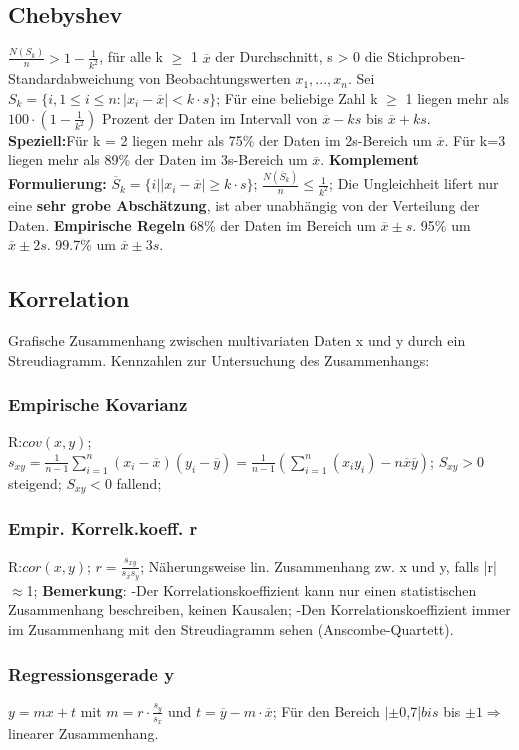       \subsection{Chebyshev}
      $\frac{N(S_{k})}{n} > 1-\frac{1}{k^2}$, für alle k $\geq$ 1
      $\overline{x}$ der Durchschnitt, s > 0 die Stichproben-Standardabweichung von Beobachtungswerten $x_{1}, ..., x_{n}$. Sei $S_{k} = \{i, 1 \leq i \leq n: |x_{i} - \overline{x}| < k \cdot s\}$; Für eine beliebige Zahl k $\geq$ 1 liegen mehr als $100 \cdot (1-\frac{1}{k^2})$ Prozent der Daten im Intervall von $\overline{x} - ks$ bis $ \overline{x} + ks$. \textbf{Speziell:}Für k = 2 liegen mehr als 75\% der Daten im 2s-Bereich um $\overline{x}$. Für k=3 liegen mehr als 89\% der Daten im 3s-Bereich um $\overline{x}$. \textbf{Komplement Formulierung:} $\overline{S}_{k} = \{i | |x_{i}-\overline{x}| \geq k \cdot s\}$; 
      $\frac{N(\overline{S}_{k})}{n} \leq \frac{1}{k^2}$; Die Ungleichheit lifert nur eine \textbf{sehr grobe Abschätzung}, ist aber unabhängig von der Verteilung der Daten. \textbf{Empirische Regeln} 68\% der Daten im Bereich um $\overline{x} \pm s$. 95\% um $\overline{x} \pm 2s$. 99.7\% um $\overline{x} \pm3s$.
      \subsection{Korrelation}
      Grafische Zusammenhang zwischen multivariaten Daten x und y durch ein Streudiagramm. Kennzahlen zur Untersuchung des Zusammenhangs:
      \subsubsection{Empirische Kovarianz}
      R:$cov(x,y)$;
      $s_{xy} = \frac{1}{n-1}\sum_{i=1}^{n}(x_{i}-\overline{x})(y_{i}-\overline{y})=\frac{1}{n-1}(\sum_{i=1}^{n}(x_{i}y_{i})- n\overline{x}\overline{y})$; 
      $ S_{xy} > 0 $ steigend; 
      $ S_{xy} < 0 $ fallend; 
      \subsubsection{Empir. Korrelk.koeff. r}
      R:$cor(x,y)$;
      $r = \frac{s_{xy}}{s_{x}s_{y}}$; Näherungsweise lin. Zusammenhang zw. x und y, falls |r| $\approx$1;
      \textbf{Bemerkung}: -Der Korrelationskoeffizient kann nur einen statistischen Zusammenhang beschreiben, keinen Kausalen; -Den Korrelationskoeffizient immer im Zusammenhang mit den Streudiagramm sehen (Anscombe-Quartett).
      \subsubsection{Regressionsgerade y}
      $y = mx + t$ mit $m=r \cdot \frac{s_{y}}{s_{x}}$ und $ t=\overline{y} -m \cdot \overline{x}$;
      Für den Bereich $|\pm$0,7|$ bis $ bis $\pm 1   \Rightarrow $ linearer Zusammenhang.